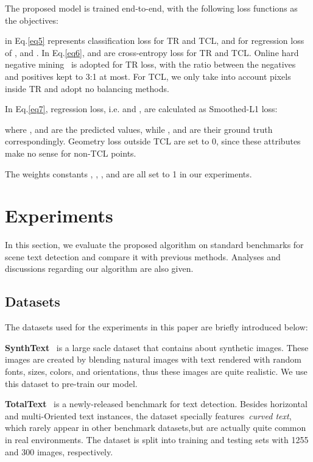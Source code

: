\documentclass[runningheads]{llncs}
\begin{document}
The proposed model is trained end-to-end, with the following loss functions as the objectives:






 in Eq.\ref{eq5} represents classification loss for TR and TCL,  and  for regression loss of ,  and . In Eq.\ref{eq6},  and  are cross-entropy loss for TR and TCL. Online hard negative mining~\cite{Shrivastava2016Training} is adopted for TR loss, with the ratio between the negatives and positives kept to 3:1 at most. For TCL, we only take into account pixels inside TR and adopt no balancing methods.

In Eq.\ref{eq7}, regression loss, i.e.   and , are calculated as Smoothed-L1 loss\cite{Girshick_2015_ICCV}:



where ,  and  are the predicted values, while ,  and  are their ground truth correspondingly. Geometry loss outside TCL are set to 0, since these attributes make no sense for non-TCL points.

The weights constants , , ,  and  are all set to  1 in our experiments.




\section{Experiments}

In this section, we evaluate the proposed algorithm on standard benchmarks for scene text detection and compare it with previous methods. Analyses and discussions regarding our algorithm are also given.

\subsection{Datasets}

The datasets used for the experiments in this paper are briefly introduced below:

\textbf{SynthText}~\cite{gupta2016synthetic} is a large sacle dataset that contains about  synthetic images. These images are created by blending natural images with text rendered with random fonts, sizes, colors, and orientations, thus these images are quite realistic. We use this dataset to pre-train our model.



\textbf{TotalText}~\cite{kheng2017total} is a newly-released benchmark for text detection. Besides horizontal and multi-Oriented text instances, the dataset specially features~\textit{curved text}, which rarely appear in other benchmark datasets,but are actually quite common in real environments. The dataset is split into training and testing sets with 1255 and 300 images, respectively.
\end{document}
